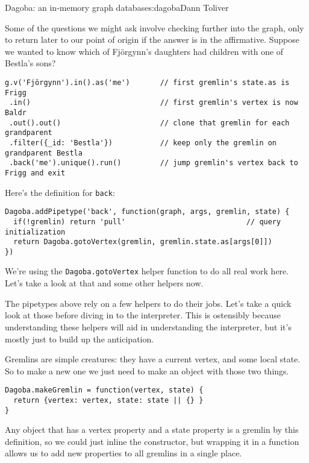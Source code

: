 \begin{aosachapter}{Dagoba: an in-memory graph database}{s:dagoba}{Dann Toliver}
\label{back}

Some of the questions we might ask involve checking further into the
graph, only to return later to our point of origin if the answer is in
the affirmative. Suppose we wanted to know which of Fjörgynn's daughters
had children with one of Bestla's sons?

\begin{verbatim}
g.v('Fjörgynn').in().as('me')       // first gremlin's state.as is Frigg
 .in()                              // first gremlin's vertex is now Baldr
 .out().out()                       // clone that gremlin for each grandparent
 .filter({_id: 'Bestla'})           // keep only the gremlin on grandparent Bestla
 .back('me').unique().run()         // jump gremlin's vertex back to Frigg and exit
\end{verbatim}

Here's the definition for \texttt{back}:

\begin{verbatim}
Dagoba.addPipetype('back', function(graph, args, gremlin, state) {
  if(!gremlin) return 'pull'                            // query initialization
  return Dagoba.gotoVertex(gremlin, gremlin.state.as[args[0]])
})
\end{verbatim}

We're using the \texttt{Dagoba.gotoVertex} helper function to do all
real work here. Let's take a look at that and some other helpers now.

\label{helpers}

The pipetypes above rely on a few helpers to do their jobs. Let's take a
quick look at those before diving in to the interpreter. This is
ostensibly because understanding these helpers will aid in understanding
the interpreter, but it's mostly just to build up the anticipation.

\label{gremlins}

Gremlins are simple creatures: they have a current vertex, and some
local state. So to make a new one we just need to make an object with
those two things.

\begin{verbatim}
Dagoba.makeGremlin = function(vertex, state) {
  return {vertex: vertex, state: state || {} }
}
\end{verbatim}

Any object that has a vertex property and a state property is a gremlin
by this definition, so we could just inline the constructor, but
wrapping it in a function allows us to add new properties to all
gremlins in a single place.


\end{aosachapter}
